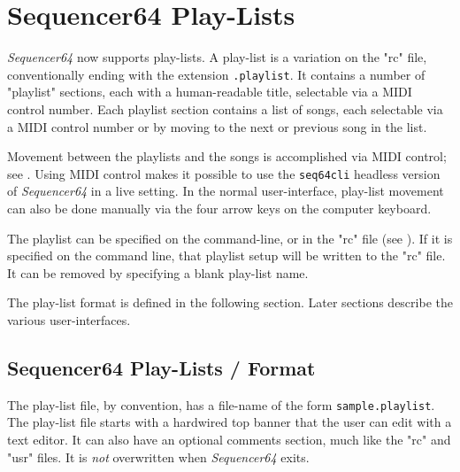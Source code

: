 %
%
%

\section{Sequencer64 Play-Lists}
\label{sec:playlist}

   \textsl{Sequencer64} now supports play-lists.
   A play-list is a variation on the "rc" file, conventionally ending with the
   extension \texttt{.playlist}.  It contains a number of "playlist" sections,
   each with a human-readable title, selectable via a MIDI control number.
   Each playlist section contains a list of songs, each selectable via a MIDI
   control number or by moving to the next or previous song in the list.

   Movement between the playlists and the songs is accomplished via 
   MIDI control; see
   .
   Using MIDI control makes it possible to use the \texttt{seq64cli}
   headless version of \textsl{Sequencer64} in a live setting.
   In the normal user-interface, play-list movement
   can also be done manually via the four arrow keys on the computer
   keyboard.

   The playlist can be specified on the command-line, or in
   the "rc" file (see ).
   If it is specified on the command line, that playlist setup will
   be written to the "rc" file.  It can be removed by specifying a blank
   play-list name.

   The play-list format is defined in the following section.
   Later sections describe the various user-interfaces.

\subsection{Sequencer64 Play-Lists / Format}
\label{subsec:playlist_setup}

   The play-list file, by convention, has a file-name of the form
   \texttt{sample.playlist}.
   The play-list file starts with a hardwired top banner that the user can edit
   with a text editor.  It can also have an optional comments section, much
   like the "rc" and "usr" files.  It is \textsl{not} overwritten
   when \textsl{Sequencer64} exits.

